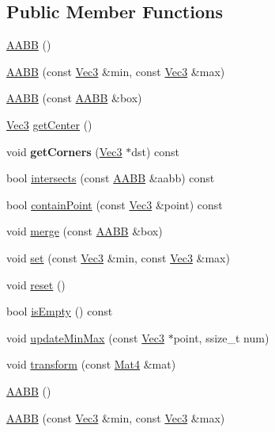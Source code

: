 \subsection*{Public Member Functions}
\begin{DoxyCompactItemize}
\item 
\hyperlink{classAABB_a948c874a4c6bc1ef7b84eef5e806f9e3}{A\+A\+BB} ()
\item 
\hyperlink{classAABB_a752c7688271964a668be954aaadb7faa}{A\+A\+BB} (const \hyperlink{classVec3}{Vec3} \&min, const \hyperlink{classVec3}{Vec3} \&max)
\item 
\hyperlink{classAABB_a16fef3ef57ae606861e19171622e1c14}{A\+A\+BB} (const \hyperlink{classAABB}{A\+A\+BB} \&box)
\item 
\hyperlink{classVec3}{Vec3} \hyperlink{classAABB_a43ae5dd7957d00b97b8d567476826762}{get\+Center} ()
\item 
\mbox{\label{classAABB_adda7549e43f3a86134d0a90d21ba6251}} 
void {\bfseries get\+Corners} (\hyperlink{classVec3}{Vec3} $\ast$dst) const
\item 
bool \hyperlink{classAABB_abc1e3b1f4eccf3f2e3c7683a92b8bda3}{intersects} (const \hyperlink{classAABB}{A\+A\+BB} \&aabb) const
\item 
bool \hyperlink{classAABB_a5ff6408910dc4efafc325458a44a7835}{contain\+Point} (const \hyperlink{classVec3}{Vec3} \&point) const
\item 
void \hyperlink{classAABB_ad629f50f834164e7a4d451268798db5a}{merge} (const \hyperlink{classAABB}{A\+A\+BB} \&box)
\item 
void \hyperlink{classAABB_affb444abca90805ba57c528e9ccf3197}{set} (const \hyperlink{classVec3}{Vec3} \&min, const \hyperlink{classVec3}{Vec3} \&max)
\item 
void \hyperlink{classAABB_a5cbdbeaef02a2a748105c940c49bba74}{reset} ()
\item 
bool \hyperlink{classAABB_a477f106679bcd7dd24c3836bb242e542}{is\+Empty} () const
\item 
void \hyperlink{classAABB_a08f4e4ad7a09b30f79ab80a0c6056ede}{update\+Min\+Max} (const \hyperlink{classVec3}{Vec3} $\ast$point, ssize\+\_\+t num)
\item 
void \hyperlink{classAABB_a452039f8d83a813398c23e1d47787038}{transform} (const \hyperlink{classMat4}{Mat4} \&mat)
\item 
\hyperlink{classAABB_a5f5baf6c533905aa1456b3a3eb57bab2}{A\+A\+BB} ()
\item 
\hyperlink{classAABB_a752c7688271964a668be954aaadb7faa}{A\+A\+BB} (const \hyperlink{classVec3}{Vec3} \&min, const \hyperlink{classVec3}{Vec3} \&max)

\end{DoxyCompactItemize}
